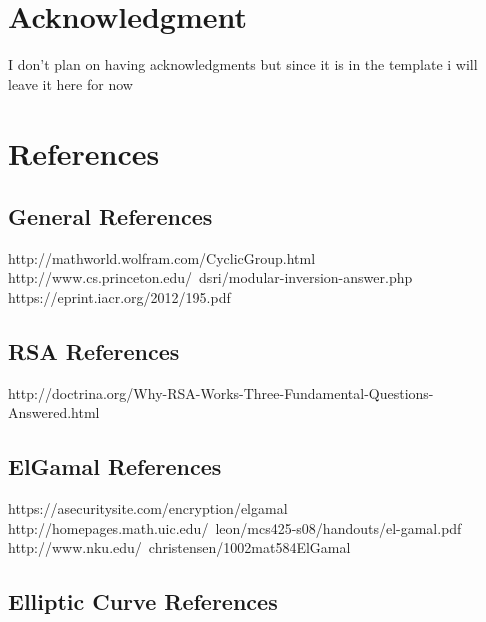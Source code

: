 \documentclass[conference]{IEEEtran}
\begin{document}
\section*{Acknowledgment}

I don't plan on having acknowledgments but since it is in the template i will leave it here for now





\section{References}
\subsection{General References}
http://mathworld.wolfram.com/CyclicGroup.html \newline
http://www.cs.princeton.edu/~dsri/modular-inversion-answer.php \newline
https://eprint.iacr.org/2012/195.pdf \newline

\subsection{RSA References}
http://doctrina.org/Why-RSA-Works-Three-Fundamental-Questions-Answered.html \newline


\subsection{ElGamal References}
https://asecuritysite.com/encryption/elgamal \newline
http://homepages.math.uic.edu/~leon/mcs425-s08/handouts/el-gamal.pdf \newline
http://www.nku.edu/~christensen/1002mat584ElGamal%

\subsection{Elliptic Curve References}


\end{document}

